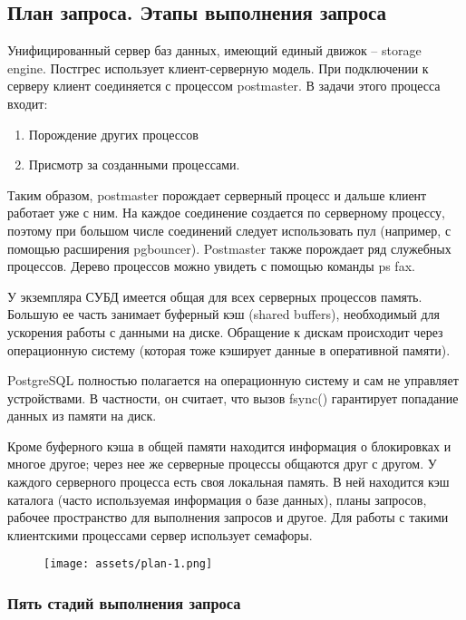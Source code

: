 \newpage

\subsection{План запроса. Этапы выполнения запроса}

Унифицированный сервер баз данных, имеющий единый движок – storage
engine. Постгрес использует клиент-серверную модель.
При подключении к серверу клиент соединяется с процессом postmaster. В
задачи этого
процесса входит:

\begin{enumerate}
	\item Порождение других процессов
	\item Присмотр за созданными процессами.
\end{enumerate}

Таким образом, postmaster порождает серверный процесс и дальше клиент
работает уже с ним. На каждое соединение создается по серверному
процессу, поэтому при большом числе соединений следует использовать
пул (например, с помощью расширения pgbouncer). Postmaster также
порождает ряд служебных процессов. Дерево процессов можно увидеть с
помощью команды ps fax.

У экземпляра СУБД имеется общая для всех серверных процессов память.
Большую ее часть занимает буферный кэш (shared buffers), необходимый
для ускорения работы с данными на диске. Обращение к дискам
происходит через операционную систему (которая тоже кэширует данные в
оперативной памяти).

PostgreSQL полностью полагается на операционную систему и сам не
управляет устройствами. В частности, он считает, что вызов fsync()
гарантирует попадание данных из
памяти на диск.

Кроме буферного кэша в общей памяти находится информация о
блокировках и многое
другое; через нее же серверные процессы общаются друг с другом. У
каждого серверного
процесса есть своя локальная память. В ней находится кэш каталога (часто
используемая
информация о базе данных), планы запросов, рабочее пространство для
выполнения запросов и другое. Для работы с такими клиентскими
процессами сервер использует семафоры.

\begin{figure}[ht!]
	\centering
	\texttt{[image: assets/plan-1.png]}
	\caption{} 
\end{figure}
\FloatBarrier

\subsubsection{Пять стадий выполнения запроса}


